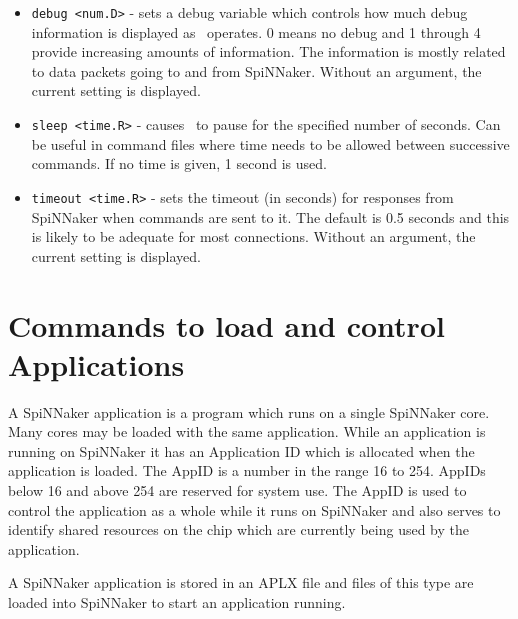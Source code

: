 \begin{itemize}

\item
\texttt{debug <num.D>} - sets a debug variable which controls how much debug
information is displayed as \ybug\ operates. 0 means no debug and 1
through 4 provide increasing amounts of information. The information
is mostly related to data packets going to and from SpiNNaker. Without
an argument, the current setting is displayed.

\item
\texttt{sleep <time.R>} - causes \ybug\ to pause for the
specified number of seconds. Can be useful in command files where time
needs to be allowed between successive commands. If no time is given,
1 second is used.

\item
\texttt{timeout <time.R>} - sets the timeout (in seconds) for responses from
SpiNNaker when commands are sent to it. The default is 0.5 seconds and
this is likely to be adequate for most connections.  Without an
argument, the current setting is displayed.

\end{itemize}

\section{Commands to load and control Applications}

A SpiNNaker application is a program which runs on a single SpiNNaker
core. Many cores may be loaded with the same application. While an
application is running on SpiNNaker it has an Application ID which is
allocated when the application is loaded. The AppID is a number in the
range 16 to 254. AppIDs below 16 and above 254 are reserved for system
use. The AppID is used to control the application as a whole while it
runs on SpiNNaker and also serves to identify shared resources on the
chip which are currently being used by the application.

A SpiNNaker application is stored in an APLX file and files of this
type are loaded into SpiNNaker to start an application running.

